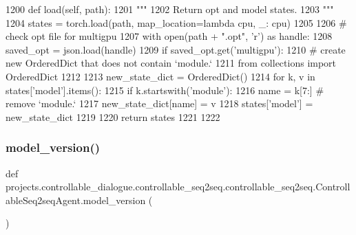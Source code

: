\begin{DoxyCode}
1200     \textcolor{keyword}{def }load(self, path):
1201         \textcolor{stringliteral}{"""}
1202 \textcolor{stringliteral}{        Return opt and model states.}
1203 \textcolor{stringliteral}{        """}
1204         states = torch.load(path, map\_location=\textcolor{keyword}{lambda} cpu, \_: cpu)
1205 
1206         \textcolor{comment}{# check opt file for multigpu}
1207         with open(path + \textcolor{stringliteral}{".opt"}, \textcolor{stringliteral}{'r') as handle:}
1208 \textcolor{stringliteral}{            saved\_opt = json.load(handle)}
1209 \textcolor{stringliteral}{        }\textcolor{keywordflow}{if} saved\_opt.get(\textcolor{stringliteral}{'multigpu'}):
1210             \textcolor{comment}{# create new OrderedDict that does not contain `module.`}
1211             \textcolor{keyword}{from} collections \textcolor{keyword}{import} OrderedDict
1212 
1213             new\_state\_dict = OrderedDict()
1214             \textcolor{keywordflow}{for} k, v \textcolor{keywordflow}{in} states[\textcolor{stringliteral}{'model'}].items():
1215                 \textcolor{keywordflow}{if} k.startswith(\textcolor{stringliteral}{'module'}):
1216                     name = k[7:]  \textcolor{comment}{# remove `module.`}
1217                     new\_state\_dict[name] = v
1218             states[\textcolor{stringliteral}{'model'}] = new\_state\_dict
1219 
1220         \textcolor{keywordflow}{return} states
1221 
1222 
\end{DoxyCode}
\mbox{\label{classprojects_1_1controllable__dialogue_1_1controllable__seq2seq_1_1controllable__seq2seq_1_1ControllableSeq2seqAgent_ab10efe928769fe5a7d398930e1d5174c}} 
\subsubsection{\texorpdfstring{model\+\_\+version()}{model\_version()}}
{\footnotesize\ttfamily def projects.\+controllable\+\_\+dialogue.\+controllable\+\_\+seq2seq.\+controllable\+\_\+seq2seq.\+Controllable\+Seq2seq\+Agent.\+model\+\_\+version (\begin{DoxyParamCaption}{ }\end{DoxyParamCaption})\hspace{0.3cm}{\ttfamily [static]}}


